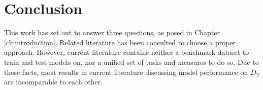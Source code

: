 \section{Conclusion}\label{ch:conclusion}
This work has set out to answer three questions, as posed in Chapter \ref{ch:introduction}. Related literature has been consulted to choose a proper approach. However, current literature contains neither a benchmark dataset to train and test models on, nor a unified set of tasks and measures to do so. Due to these facts, most results in current literature discussing model performance on $D_{2}$ are incomparable to each other.

%
%
%
